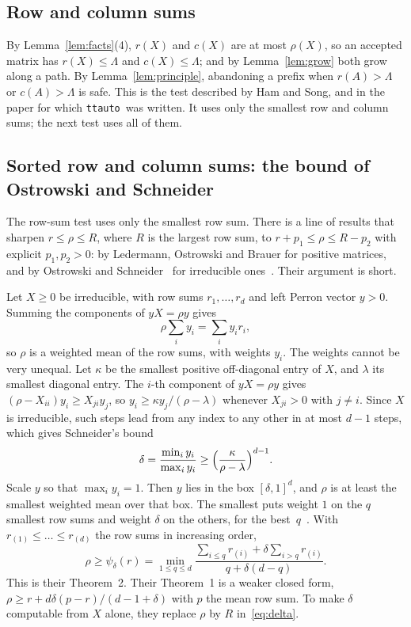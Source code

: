 \documentclass[11pt]{amsart}
\newcommand{\ttauto}{\texttt{ttauto}}
\newcommand{\lam}{\lambda}
\newcommand{\Lam}{\Lambda}
\theoremstyle{plain}
\theoremstyle{definition}
\begin{document}
\subsection{Row and column sums}

By Lemma~\ref{lem:facts}(4), $r(X)$ and $c(X)$ are at most $\rho(X)$, so
an accepted matrix has $r(X)\le\Lam$ and $c(X)\le\Lam$; and by
Lemma~\ref{lem:grow} both grow along a path.  By
Lemma~\ref{lem:principle}, abandoning a prefix when $r(A)>\Lam$ or
$c(A)>\Lam$ is safe.  This is the test described by Ham and Song, and in
the paper for which \ttauto\ was written.  It uses only the smallest row
and column sums; the next test uses all of them.

\subsection{Sorted row and column sums: the bound of Ostrowski and Schneider}
\label{sec:os}

The row-sum test uses only the smallest row sum.  There is a line of
results that sharpen $r\le\rho\le R$, where $R$ is the largest row sum, to
$r+p_1\le\rho\le R-p_2$ with explicit $p_1,p_2>0$: by Ledermann, Ostrowski
and Brauer for positive matrices, and by Ostrowski and
Schneider~\cite{OstrowskiSchneider} for irreducible
ones~\cite[p.~65]{Seneta}.  Their argument is short.

Let $X\ge0$ be irreducible, with row sums $r_1,\dots,r_d$ and left Perron
vector $y>0$.  Summing the components of $yX=\rho y$ gives
\[
  \rho\sum_iy_i=\sum_iy_ir_i,
\]
so $\rho$ is a weighted mean of the row sums, with weights $y_i$.  The
weights cannot be very unequal.  Let $\kappa$ be the smallest positive
off-diagonal entry of $X$, and $\lam$ its smallest diagonal entry.  The
$i$-th component of $yX=\rho y$ gives $(\rho-X_{ii})y_i\ge X_{ji}y_j$, so
$y_i\ge\kappa y_j/(\rho-\lam)$ whenever $X_{ji}>0$ with $j\ne i$.  Since
$X$ is irreducible, such steps lead from any index to any other in at most
$d-1$ steps, which gives Schneider's bound~\cite{Schneider58}
\begin{equation}
  \label{eq:delta}
  \delta=\frac{\min_iy_i}{\max_iy_i}
  \ge\Bigl(\frac{\kappa}{\rho-\lam}\Bigr)^{d-1}.
\end{equation}
Scale $y$ so that $\max_iy_i=1$.  Then $y$ lies in the box $[\delta,1]^d$,
and $\rho$ is at least the smallest weighted mean over that box.  The
smallest puts weight $1$ on the $q$ smallest row sums and weight $\delta$ on
the others, for the best~$q$~\cite[Lemma~2]{OstrowskiSchneider}.  With
$r_{(1)}\le\dots\le r_{(d)}$ the row sums in increasing order,
\begin{equation}
  \label{eq:os}
  \rho\ge\psi_\delta(r)=\min_{1\le q\le d}
  \frac{\sum_{i\le q}r_{(i)}+\delta\sum_{i>q}r_{(i)}}{q+\delta(d-q)}.
\end{equation}
This is their Theorem~2.  Their Theorem~1 is a weaker closed form,
$\rho\ge r+d\delta(p-r)/(d-1+\delta)$ with $p$ the mean row sum.  To make
$\delta$ computable from $X$ alone, they replace $\rho$ by $R$
in~\eqref{eq:delta}.
\end{document}
